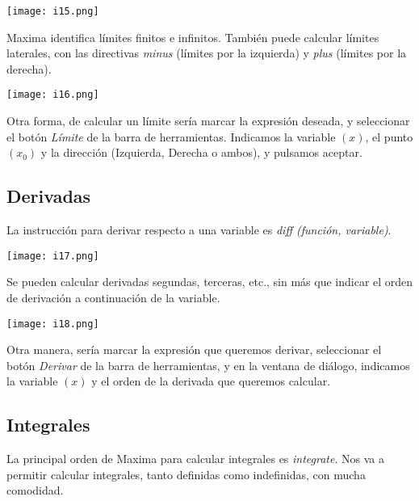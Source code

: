 \documentclass[12pt]{article}
\begin{document}
\begin{center}
   \texttt{[image: i15.png]}\\
\end{center}

Maxima identifica límites finitos e infinitos. También puede calcular límites laterales, con las directivas \textit{minus} (límites por la izquierda) y \textit{plus} (límites por la derecha).

\begin{center}
   \texttt{[image: i16.png]}\\
\end{center}

Otra forma, de calcular un límite sería marcar la expresión deseada, y seleccionar el botón \textit{Límite} de la barra de herramientas. Indicamos la variable $(x)$, el punto $(x_0)$ y la dirección (Izquierda, Derecha o ambos), y pulsamos aceptar.

\subsection*{Derivadas}
La instrucción para derivar respecto a una variable es \textit{diff (función, variable)}.

\begin{center}
   \texttt{[image: i17.png]}\\
\end{center}

Se pueden calcular derivadas segundas, terceras, etc., sin más que indicar el orden de derivación a continuación de la variable.

\begin{center}
   \texttt{[image: i18.png]}\\
\end{center}

Otra manera, sería marcar la expresión que queremos derivar, seleccionar el botón \textit{Derivar} de la barra de herramientas, y en la ventana de diálogo, indicamos la variable $(x)$ y el orden de la derivada que queremos calcular.

\subsection*{Integrales}
La principal orden de Maxima para calcular integrales es \textit{integrate}. Nos va a permitir calcular integrales, tanto definidas como indefinidas, con mucha comodidad. \\
\end{document}
